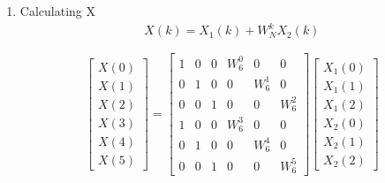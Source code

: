 \documentclass[journal,12pt,twocolumn]{IEEEtran}
\renewcommand\thesection{\arabic{section}}
\begin{document}
\begin{enumerate}[label=\thesection.\arabic*.,ref=\thesection.\theenumi]
\item Calculating X
\begin{align}
   X(k) = X_{1}(k) + W^{k}_{N}X_{2}(k)
\end{align}

\begin{equation}
\begin{bmatrix}
X(0) \\ 
X(1) \\ 
X(2) \\ 
X(3) \\ 
X(4) \\ 
X(5) 
\end{bmatrix}
=
\begin{bmatrix}
1 & 0 & 0 & W^{0}_{6} & 0 & 0\\
0 & 1 & 0 &  0 & W^{1}_{6} & 0\\
0 & 0 & 1 & 0 & 0 & W^{2}_{6}\\
1 & 0 & 0 & W^{3}_{6} & 0 & 0\\
0 & 1 & 0 & 0 & W^{4}_{6} & 0\\
0 & 0 & 1 & 0 & 0 & W^{5}_{6}
\end{bmatrix}
\begin{bmatrix}
X_{1}(0) \\ 
X_{1}(1) \\ 
X_{1}(2) \\ 
X_{2}(0) \\ 
X_{2}(1) \\ 
X_{2}(2)
\end{bmatrix}
\end{equation}


\end{enumerate}
\end{document}
